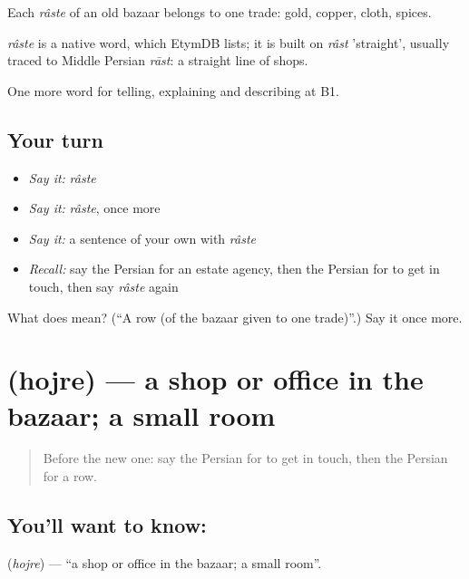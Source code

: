 Each \emph{râste} of an old bazaar belongs to one trade: gold, copper, cloth, spices.

\begin{cousinweb}
\emph{râste} is a native word, which EtymDB lists; it is built on \emph{râst} 'straight', usually traced to Middle Persian \emph{rāst}: a straight line of shops.
\end{cousinweb}

\begin{grammarlens}[title={What you've built}]
One more word for telling, explaining and describing at B1.
\end{grammarlens}

\subsection*{Your turn}
\begin{itemize}
\raggedright
  \item \emph{Say it:} \emph{râste}
  \item \emph{Say it:} \emph{râste}, once more
  \item \emph{Say it:} a sentence of your own with \emph{râste}
  \item \emph{Recall:} say the Persian for an estate agency, then the Persian for to get in touch, then say \emph{râste} again
\end{itemize}

\begin{tcolorbox}[breakable,colback=teal!4,colframe=teal!35!black,title={Before you move on}]
What does  mean? (\textquotedblleft{}A row (of the bazaar given to one trade)\textquotedblright{}.) Say it once more.
\end{tcolorbox}
\section[\texorpdfstring{\fa{حجره} (hojre)}{حجره (hojre)}]{ (hojre) — a shop or office in the bazaar; a small room}

\label{lesson:FA-C457-hojre}



\begin{quote}
Before the new one: say the Persian for to get in touch, then the Persian for a row.
\end{quote}

\subsection*{You'll want to know: }
\textbf{} (\emph{hojre}) — \textquotedblleft{}a shop or office in the bazaar; a small room\textquotedblright{}.

